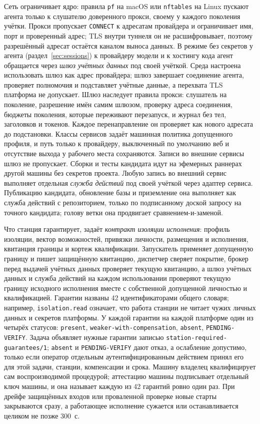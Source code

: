 \documentclass[10pt,a4paper]{article}
\begin{document}
Сеть ограничивает ядро: правила \texttt{pf} на macOS или \texttt{nftables} на Linux пускают агента только к слушателю доверенного прокси, своему у каждого поколения учётки. Прокси пропускает \texttt{CONNECT} к адресатам провайдера и ограничивает имя, порт и проверенный адрес; TLS внутри туннеля он не расшифровывает, поэтому разрешённый адресат остаётся каналом выноса данных. В режиме без секретов у агента (раздел~\ref{sec:sessions}) к провайдеру модели и к хостингу кода агент обращается через \emph{шлюз учётных данных} под своей учёткой. Среда настроена использовать шлюз как адрес провайдера; шлюз завершает соединение агента, проверяет полномочия и подставляет учётные данные, а перехвата TLS платформа не допускает. Шлюз наследует правила прокси: слушатель на поколение, разрешение имён самим шлюзом, проверку адреса соединения, бюджеты поколения, которые переживают перезапуск, и журнал без тел, заголовков и токенов. Каждое перенаправление он проверяет как нового адресата до подстановки. Классы сервисов задаёт машинная политика допущенного профиля, и путь только к провайдеру, выключенный по умолчанию веб и отсутствие выхода у рабочего места сохраняются. Записи во внешние сервисы шлюз не пропускает. Сборки и тесты кандидата идут на эфемерных раннерах другой машины без секретов проекта. Любую запись во внешний сервис выполняет отдельная \emph{служба действий} под своей учёткой через адаптер сервиса. Публикацию кандидата, обновление базы и приземление она выполняет как служба действий с репозиторием, только по подписанному доской запросу на точного кандидата; голову ветки она продвигает сравнением-и-заменой.

Что станция гарантирует, задаёт \emph{контракт изоляции исполнения}: профиль изоляции, вектор возможностей, привязки личности, размещения и исполнения, квитанция границы и кортеж квалификации. Запускатель применяет допущенную границу и пишет защищённую квитанцию, диспетчер сверяет покрытие, брокер перед выдачей учётных данных проверяет текущую квитанцию, а шлюз учётных данных и служба действий на каждом использовании проверяют текущую границу исходного исполнения вместе с собственной допущенной личностью и квалификацией. Гарантии названы 42 идентификаторами общего словаря; например, \texttt{isolation.read} означает, что работа станции не читает чужих личных данных и секретов платформы. У каждой гарантии на каждой платформе один из четырёх статусов: \texttt{present}, \texttt{weaker-with-compensation}, \texttt{absent}, \texttt{PENDING-VERIFY}. Задача объявляет нужные гарантии записью \texttt{station-required-guarantees/1}; \texttt{absent} и \texttt{PENDING-VERIFY} дают отказ, а ослабление допустимо, только если оператор отдельным аутентифицированным действием принял его для этой задачи, станции, компенсации и срока. Машину владелец квалифицирует сам воспроизводимой процедурой; аттестацию машины подписывает отдельный ключ машины, и она называет каждую из 42 гарантий ровно один раз. При дрейфе защищённых входов или проваленной проверке новые старты закрываются сразу, а работающее исполнение сужается или останавливается целиком не позже 300~с.
\end{document}
